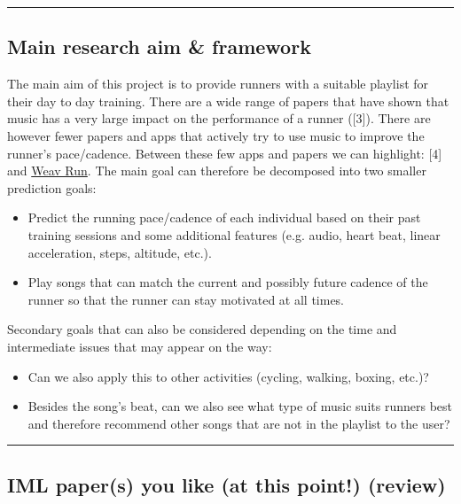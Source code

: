 \documentclass[
  12pt,
]{article}
\begin{document}
\begin{center}\rule{0.5\linewidth}{0.5pt}\end{center}

\hypertarget{main-research-aim-framework}{%
\subsection{Main research aim \&
framework}\label{main-research-aim-framework}}

The main aim of this project is to provide runners with a suitable
playlist for their day to day training. There are a wide range of papers
that have shown that music has a very large impact on the performance of
a runner ({[}3{]}). There are however fewer papers and apps that
actively try to use music to improve the runner's pace/cadence. Between
these few apps and papers we can highlight: {[}4{]} and
\href{https://run.weav.io/}{Weav Run}. The main goal can therefore be
decomposed into two smaller prediction goals:

\begin{itemize}
\item Predict the running pace/cadence of each individual based on their past training sessions and some additional features (e.g. audio, heart beat, linear acceleration, steps, altitude, etc.).
\item Play songs that can match the current and possibly future cadence of the runner so that the runner can stay motivated at all times.
\end{itemize}

Secondary goals that can also be considered depending on the time and
intermediate issues that may appear on the way:

\begin{itemize}
\item Can we also apply this to other activities (cycling, walking, boxing, etc.)?
\item Besides the song’s beat, can we also see what type of music suits runners best and therefore recommend other songs that are not in the playlist to the user?
\end{itemize}

\begin{center}\rule{0.5\linewidth}{0.5pt}\end{center}

\hypertarget{iml-papers-you-like-at-this-point-review}{%
\subsection{IML paper(s) you like (at this point!)
(review)}\label{iml-papers-you-like-at-this-point-review}}
\end{document}

